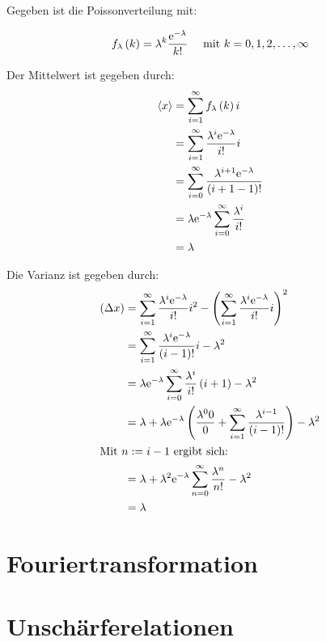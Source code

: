 \documentclass[11pt, ngerman, fleqn, DIV=15, headinclude]{scrartcl}
\begin{document}
\subsection{}

Gegeben ist die Poissonverteilung mit:

\begin{align}
	f_\lambda\left( k \right) = \lambda^k \frac{\mathrm e^{-\lambda}}{k!} \quad\text{ mit } k =
	0,1,2,\ldots,\infty
\end{align}

Der Mittelwert ist gegeben durch:
\begin{align*}
	\langle x \rangle &= \sum_{i=1}^\infty f_\lambda\left( k \right) i\\
	&= \sum_{i=1}^\infty \frac{\lambda^i \mathrm e^{-\lambda}}{i!}i\\
	&= \sum_{i=0}^\infty \frac{\lambda^{i+1}
	\mathrm e^{-\lambda}}{\left( i+1-1 \right)!}\\
	&= \lambda \mathrm e^{-\lambda} \sum_{i=0}^\infty \frac{\lambda^i}{i!}\\
	&= \lambda
\end{align*}

Die Varianz ist gegeben durch:
\begin{align*}
	\left( \Delta x \right) &= \sum_{i=1}^\infty \frac{\lambda^i
		\mathrm e^{-\lambda}}{i!} i^2 - \left( \sum_{i=1}^\infty
		\frac{\lambda^i \mathrm e^{-\lambda}}{i!} i \right)^2\\
		&= \sum_{i=1}^\infty \frac{\lambda^i
			\mathrm e^{-\lambda}}{\left( i-1 \right)!} i - \lambda^2\\
			&= \lambda \mathrm e^{-\lambda} \sum_{i=0}^\infty
			\frac{\lambda^i}{i!} \left( i+1 \right) - \lambda^2\\
		&= \lambda + \lambda \mathrm e^{-\lambda}\left(  \frac{\lambda^0 0}0 +
		\sum_{i=1}^\infty \frac{\lambda^{i-1}}{\left( i-1 \right)!}  \right)
		-\lambda^2\\
	\intertext{Mit $n := i-1$ ergibt sich:}
	&= \lambda + \lambda^2 \mathrm e^{-\lambda} \sum_{n=0}^\infty
	\frac{\lambda^n}{n!} - \lambda^2\\
	&= \lambda
\end{align*}

\subsection{}


\section{Fouriertransformation}


\section{Unschärferelationen}
\end{document}
